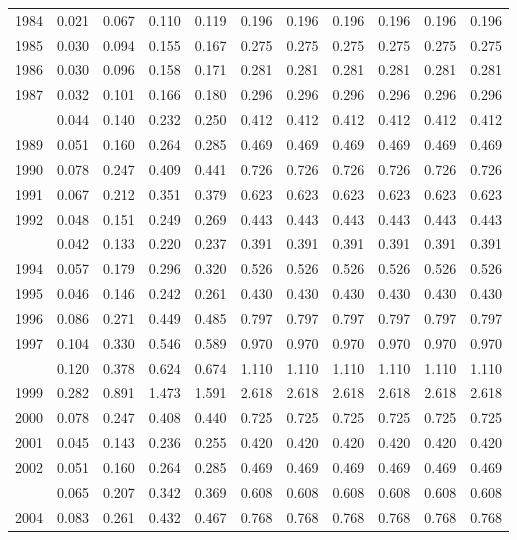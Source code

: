 \documentclass[
]{article}
\begin{document}
\begin{longtable}[t]{lrrrrrrrrrr}
1984 & 0.021 & 0.067 & 0.110 & 0.119 & 0.196 & 0.196 & 0.196 & 0.196 & 0.196 & 0.196\\
1985 & 0.030 & 0.094 & 0.155 & 0.167 & 0.275 & 0.275 & 0.275 & 0.275 & 0.275 & 0.275\\
1986 & 0.030 & 0.096 & 0.158 & 0.171 & 0.281 & 0.281 & 0.281 & 0.281 & 0.281 & 0.281\\
1987 & 0.032 & 0.101 & 0.166 & 0.180 & 0.296 & 0.296 & 0.296 & 0.296 & 0.296 & 0.296\\
\addlinespace
1988 & 0.044 & 0.140 & 0.232 & 0.250 & 0.412 & 0.412 & 0.412 & 0.412 & 0.412 & 0.412\\
1989 & 0.051 & 0.160 & 0.264 & 0.285 & 0.469 & 0.469 & 0.469 & 0.469 & 0.469 & 0.469\\
1990 & 0.078 & 0.247 & 0.409 & 0.441 & 0.726 & 0.726 & 0.726 & 0.726 & 0.726 & 0.726\\
1991 & 0.067 & 0.212 & 0.351 & 0.379 & 0.623 & 0.623 & 0.623 & 0.623 & 0.623 & 0.623\\
1992 & 0.048 & 0.151 & 0.249 & 0.269 & 0.443 & 0.443 & 0.443 & 0.443 & 0.443 & 0.443\\
\addlinespace
1993 & 0.042 & 0.133 & 0.220 & 0.237 & 0.391 & 0.391 & 0.391 & 0.391 & 0.391 & 0.391\\
1994 & 0.057 & 0.179 & 0.296 & 0.320 & 0.526 & 0.526 & 0.526 & 0.526 & 0.526 & 0.526\\
1995 & 0.046 & 0.146 & 0.242 & 0.261 & 0.430 & 0.430 & 0.430 & 0.430 & 0.430 & 0.430\\
1996 & 0.086 & 0.271 & 0.449 & 0.485 & 0.797 & 0.797 & 0.797 & 0.797 & 0.797 & 0.797\\
1997 & 0.104 & 0.330 & 0.546 & 0.589 & 0.970 & 0.970 & 0.970 & 0.970 & 0.970 & 0.970\\
\addlinespace
1998 & 0.120 & 0.378 & 0.624 & 0.674 & 1.110 & 1.110 & 1.110 & 1.110 & 1.110 & 1.110\\
1999 & 0.282 & 0.891 & 1.473 & 1.591 & 2.618 & 2.618 & 2.618 & 2.618 & 2.618 & 2.618\\
2000 & 0.078 & 0.247 & 0.408 & 0.440 & 0.725 & 0.725 & 0.725 & 0.725 & 0.725 & 0.725\\
2001 & 0.045 & 0.143 & 0.236 & 0.255 & 0.420 & 0.420 & 0.420 & 0.420 & 0.420 & 0.420\\
2002 & 0.051 & 0.160 & 0.264 & 0.285 & 0.469 & 0.469 & 0.469 & 0.469 & 0.469 & 0.469\\
\addlinespace
2003 & 0.065 & 0.207 & 0.342 & 0.369 & 0.608 & 0.608 & 0.608 & 0.608 & 0.608 & 0.608\\
2004 & 0.083 & 0.261 & 0.432 & 0.467 & 0.768 & 0.768 & 0.768 & 0.768 & 0.768 & 0.768\\

\end{longtable}
\end{document}
